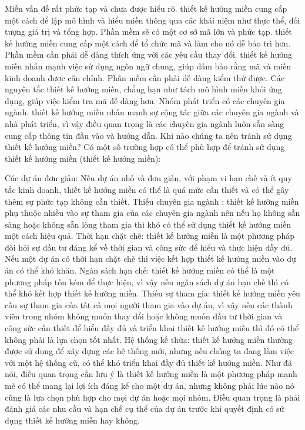Miền vấn đề rất phức tạp và chưa được hiểu rõ. thiết kế hướng miền cung cấp một cách để lập mô hình và hiểu miền thông qua các khái niệm như thực thể, đối tượng giá trị và tổng hợp.
Phần mềm sẽ có một cơ sở mã lớn và phức tạp. thiết kế hướng miền cung cấp một cách để tổ chức mã và làm cho nó dễ bảo trì hơn.
Phần mềm cần phải dễ dàng thích ứng với các yêu cầu thay đổi. thiết kế hướng miền nhấn mạnh việc sử dụng ngôn ngữ chung, giúp đảm bảo rằng mã và miền kinh doanh được căn chỉnh.
Phần mềm cần phải dễ dàng kiểm thử được. Các nguyên tắc thiết kế hướng miền, chẳng hạn như tách mô hình miền khỏi ứng dụng, giúp việc kiểm tra mã dễ dàng hơn.
Nhóm phát triển có các chuyên gia ngành. thiết kế hướng miền nhấn mạnh sự cộng tác giữa các chuyên gia ngành và nhà phát triển, vì vậy điều quan trọng là các chuyên gia ngành luôn sẵn sàng cung cấp thông tin đầu vào và hướng dẫn.
Khi nào chúng ta nên tránh sử dụng thiết kế hướng miền?
Có một số trường hợp có thể phù hợp để tránh sử dụng thiết kế hướng miền (thiết kế hướng miền):

Các dự án đơn giản: Nếu dự án nhỏ và đơn giản, với phạm vi hạn chế và ít quy tắc kinh doanh, thiết kế hướng miền có thể là quá mức cần thiết và có thể gây thêm sự phức tạp không cần thiết.
Thiếu chuyên gia ngành : thiết kế hướng miền phụ thuộc nhiều vào sự tham gia của các chuyên gia ngành nên nếu họ không sẵn sàng hoặc không sẵn lòng tham gia thì khó có thể sử dụng thiết kế hướng miền một cách hiệu quả.
Thời hạn chặt chẽ: thiết kế hướng miền là một phương pháp đòi hỏi sự đầu tư đáng kể về thời gian và công sức để hiểu và thực hiện đầy đủ. Nếu một dự án có thời hạn chặt chẽ thì việc kết hợp thiết kế hướng miền vào dự án có thể khó khăn.
Ngân sách hạn chế: thiết kế hướng miền có thể là một phương pháp tốn kém để thực hiện, vì vậy nếu ngân sách dự án hạn chế thì có thể khó kết hợp thiết kế hướng miền.
Thiếu sự tham gia: thiết kế hướng miền yêu cầu sự tham gia của tất cả mọi người tham gia vào dự án, vì vậy nếu các thành viên trong nhóm không muốn thay đổi hoặc không muốn đầu tư thời gian và công sức cần thiết để hiểu đầy đủ và triển khai thiết kế hướng miền thì đó có thể không phải là lựa chọn tốt nhất.
Hệ thống kế thừa: thiết kế hướng miền thường được sử dụng để xây dựng các hệ thống mới, nhưng nếu chúng ta đang làm việc với một hệ thống cũ, có thể khó triển khai đầy đủ thiết kế hướng miền.
Như đã nói, điều quan trọng cần lưu ý là thiết kế hướng miền là một phương pháp mạnh mẽ có thể mang lại lợi ích đáng kể cho một dự án, nhưng không phải lúc nào nó cũng là lựa chọn phù hợp cho mọi dự án hoặc mọi nhóm. Điều quan trọng là phải đánh giá các nhu cầu và hạn chế cụ thể của dự án trước khi quyết định có sử dụng thiết kế hướng miền hay không.

